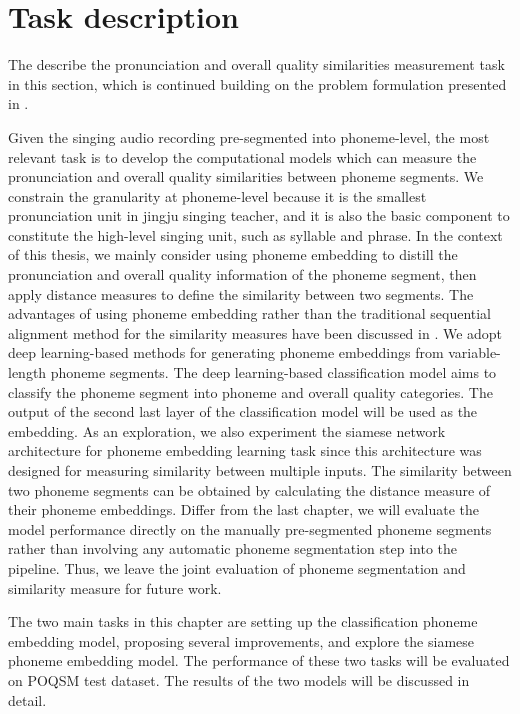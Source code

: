 \section{Task description}

The describe the pronunciation and overall quality similarities measurement task in this section, which is continued building on the problem formulation presented in .

Given the singing audio recording pre-segmented into phoneme-level, the most relevant task is to develop the computational models which can measure the pronunciation and overall quality similarities between phoneme segments. We constrain the granularity at phoneme-level because it is the smallest pronunciation unit in jingju singing teacher, and it is also the basic component to constitute the high-level singing unit, such as syllable and phrase. In the context of this thesis, we mainly consider using phoneme embedding to distill the pronunciation and overall quality information of the phoneme segment, then apply distance measures to define the similarity between two segments. The advantages of using phoneme embedding rather than the traditional sequential alignment method for the similarity measures have been discussed in . We adopt deep learning-based methods for generating phoneme embeddings from variable-length phoneme segments. The deep learning-based classification model aims to classify the phoneme segment into phoneme and overall quality categories. The output of the second last layer of the classification model will be used as the embedding. As an exploration, we also experiment the siamese network architecture for phoneme embedding learning task since this architecture was designed for measuring similarity between multiple inputs. The similarity between two phoneme segments can be obtained by calculating the distance measure of their phoneme embeddings. Differ from the last chapter, we will evaluate the model performance directly on the manually pre-segmented phoneme segments rather than involving any automatic phoneme segmentation step into the pipeline. Thus, we leave the joint evaluation of phoneme segmentation and similarity measure for future work.

The two main tasks in this chapter are setting up the classification phoneme embedding model, proposing several improvements, and explore the siamese phoneme embedding model. The performance of these two tasks will be evaluated on POQSM test dataset. The results of the two models will be discussed in detail.

